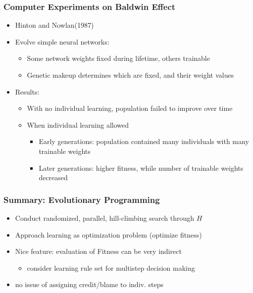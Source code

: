 \documentclass{beamer}
\begin{document}
\begin{frame}
\frametitle{Computer Experiments on Baldwin Effect}
\label{sec-6-12}

\begin{itemize}
\item Hinton and Nowlan(1987)
\item Evolve simple neural networks:
\begin{itemize}
\item Some network weights fixed during lifetime, others trainable
\item Genetic makeup determines which are fixed, and their weight values
\end{itemize}
\item Results:
\begin{itemize}
\item With no individual learning, population failed to improve over time
\item When individual learning allowed
\begin{itemize}
\item Early generations: population contained many individuals with many trainable weights
\item Later generations: higher fitness, while number of trainable weights  decreased
\end{itemize}
\end{itemize}
\end{itemize}
\end{frame}
\begin{frame}
\frametitle{Summary: Evolutionary Programming}
\label{sec-6-13}


\begin{itemize}
\item Conduct randomized, parallel, hill-climbing search through $H$
\item Approach learning as optimization problem (optimize fitness)
\item Nice feature: evaluation of Fitness can be very indirect
\begin{itemize}
\item consider learning rule set for multistep decision making
\end{itemize}
\item no issue of assigning credit/blame to indiv. steps
\end{itemize}
\end{frame}
\end{document}

